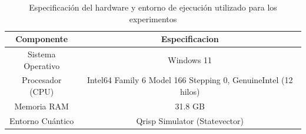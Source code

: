 \begin{table}[htbp]
  \centering
  \caption{Especificación del hardware y entorno de ejecución utilizado para los experimentos}
  \label{tab:hardware}
  \begin{tabular}{cc}
    \toprule
    Componente & Especificacion \\
    \midrule
    Sistema Operativo & Windows 11 \\
    Procesador (CPU) & Intel64 Family 6 Model 166 Stepping 0, GenuineIntel (12 hilos) \\
    Memoria RAM & 31.8 GB \\
    Entorno Cuántico & Qrisp Simulator (Statevector) \\
    \bottomrule
  \end{tabular}
\end{table}
